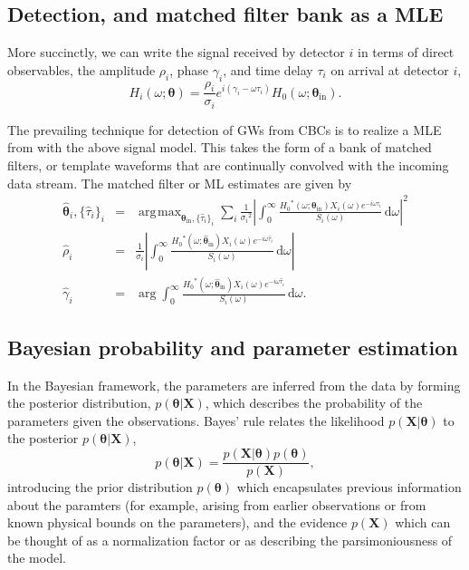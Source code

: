 \documentclass{iopart}
\DeclareMathOperator*{\argmax}{\arg\!\max}
\begin{document}
\subsection{Detection, and matched filter bank as a \ac{MLE}}

More succinctly, we can write the signal received by detector $i$ in terms of direct observables, the amplitude $\rho_i$, phase $\gamma_i$, and time delay $\tau_i$ on arrival at detector $i$,
%
\begin{equation}\label{eq:signal-model}
	H_i (\omega; \boldsymbol\theta) = \frac{\rho_i}{\sigma_i} e^{i (\gamma_i - \omega \tau_i)} H_0(\omega; \boldsymbol\theta_\mathrm{in}).
\end{equation}

The prevailing technique for detection of \acp{GW} from \acp{CBC} is to realize a \ac{MLE} from  with the above signal model. This takes the form of a bank of matched filters, or template waveforms that are continually convolved with the incoming data stream. The matched filter or \ac{ML} estimates are given by
%
\begin{eqnarray}
\hat{\boldsymbol\theta}_i, \{\hat\tau_i\}_i &=& \argmax_{\boldsymbol\theta_\mathrm{in}, \{\hat\tau_i\}_i} \sum_i \frac{1}{{\sigma_i}^2} \left| \int_0^\infty \frac{{H_0}^*(\omega; \boldsymbol\theta_\mathrm{in}) X_i(\omega) e^{-i \omega \tau_i}}{S_i(\omega)} \,\mathrm{d}\omega \right|^2 \\
\hat\rho_i &=& \frac{1}{\sigma_i} \left| \int_0^\infty \frac{{H_0}^*(\omega; \hat{\boldsymbol\theta}_\mathrm{in}) X_i(\omega) e^{-i \omega \hat\tau_i}}{S_i(\omega)} \,\mathrm{d}\omega \right| \\
\hat\gamma_i &=& \arg \int_0^\infty \frac{{H_0}^*(\omega; \hat{\boldsymbol\theta}_\mathrm{in}) X_i(\omega) e^{-i \omega \hat\tau_i}}{S_i(\omega)} \,\mathrm{d}\omega.
\end{eqnarray}

\subsection{Bayesian probability and parameter estimation}

In the Bayesian framework, the parameters are inferred from the data by forming the posterior distribution, $p(\boldsymbol\theta|\mathbf X)$, which describes the probability of the parameters given the observations. Bayes' rule relates the likelihood $p(\mathbf X|\boldsymbol\theta)$ to the posterior $p(\boldsymbol\theta|\mathbf X)$,
%
\begin{equation}\label{bayes}
p(\boldsymbol\theta|\mathbf X) = \frac{p(\mathbf X|\boldsymbol\theta) p(\boldsymbol\theta)}{p(\mathbf X)},
\end{equation}
%
introducing the prior distribution $p(\boldsymbol\theta)$ which encapsulates previous information about the paramters (for example, arising from earlier observations or from known physical bounds on the parameters), and the evidence $p(\mathbf X)$ which can be thought of as a normalization factor or as describing the parsimoniousness of the model.
\end{document}
